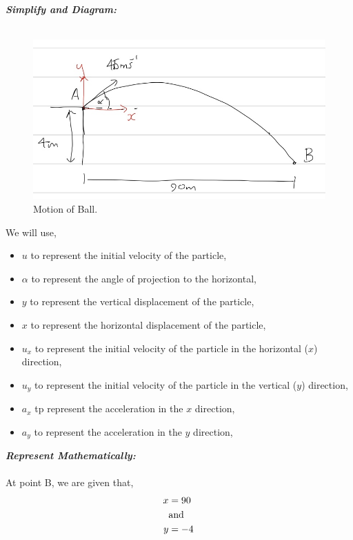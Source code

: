 \begin{subquestions}
\begin{subsubquestions}
\textbf{\textit{Simplify and Diagram:}} \\ \\
\begin{figure}[H]
	\begin{center}
		\includegraphics[scale=0.25]{../2014/figures/2014q6-2}
		\caption{\label{2014:q6:Diagram2} Motion of Ball.}
	\end{center}
\end{figure}
We will use,
\begin{itemize}
	\item $u$ to represent the initial velocity of the particle,
	\item $\alpha$ to represent the angle of projection to the horizontal,
	\item $y$ to represent the vertical displacement of the particle,
	\item $x$ to represent the horizontal displacement of the particle,
	\item $u_x$ to represent the initial velocity of the particle in the horizontal ($x$) direction,
	\item $u_y$ to represent the initial velocity of the particle in the vertical ($y$) direction,
	\item $a_x$ tp represent the acceleration in the $x$ direction,
	\item $a_y$ to represent the acceleration in the $y$ direction,
\end{itemize}  




\textbf{\textit{Represent Mathematically:}} \\ \\
At point B, we are given that,
\begin{align}
	x & = 90 \\
	  & \text{and} \nonumber \\
	y & = -4 \,
\end{align}


\end{subsubquestions}
\end{subquestions}
